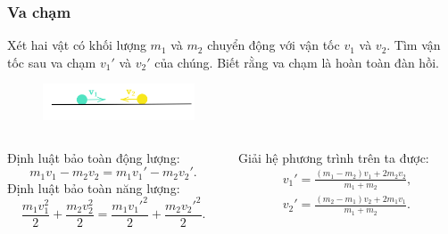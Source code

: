 \begin{frame}
\frametitle{Va chạm}
Xét hai vật có khối lượng \(m_1\) và \(m_2\) chuyển động với vận tốc \(v_1\) và \(v_2\). Tìm vận tốc sau va chạm \(v_1'\) và \(v_2'\) của chúng. Biết rằng va chạm là hoàn toàn đàn hồi.
\begin{figure}
    \centering
    \includegraphics[width=0.4\textwidth]{Content/Figure/collision.png}
\end{figure}
\pause
\begin{columns}
\begin{column}{0.5\textwidth}
\scriptsize
Định luật bảo toàn động lượng:
\begin{equation*}
    m_1 v_1 - m_2 v_2 = m_1 v_1' - m_2 v_2'.
\end{equation*}
Định luật bảo toàn năng lượng:
\begin{equation*}
    \frac{m_1 v_1^2}{2} + \frac{m_2 v_2^2}{2} = \frac{m_1 {v_1'}^2}{2} + \frac{m_2 {v_2'}^2}{2}.
\end{equation*}
\normalsize
\end{column}
\begin{column}{0.5\textwidth}
Giải hệ phương trình trên ta được:
\begin{equation}
    \begin{aligned}
    v_1' = \frac{(m_1 - m_2)v_1 + 2m_2 v_2}{m_1 + m_2},\\
    v_2' = \frac{(m_2 - m_1)v_2 + 2m_1 v_1}{m_1 + m_2}.
    \end{aligned}
\end{equation}
\end{column}
\end{columns}
\end{frame}


